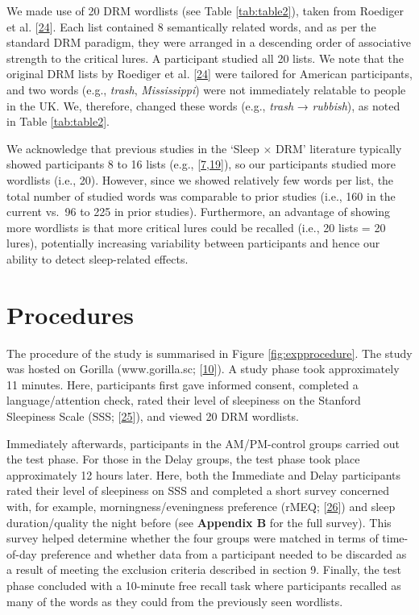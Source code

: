 \documentclass[
]{article}
\begin{document}
We made use of 20 DRM wordlists (see Table \ref{tab:table2}), taken from Roediger et al. {[}\protect\hyperlink{ref-roediger2001a}{24}{]}. Each list contained 8 semantically related words, and as per the standard DRM paradigm, they were arranged in a descending order of associative strength to the critical lures. A participant studied all 20 lists. We note that the original DRM lists by Roediger et al. {[}\protect\hyperlink{ref-roediger2001a}{24}{]} were tailored for American participants, and two words (e.g., \emph{trash}, \emph{Mississippi}) were not immediately relatable to people in the UK. We, therefore, changed these words (e.g., \emph{trash} → \emph{rubbish}), as noted in Table \ref{tab:table2}.

We acknowledge that previous studies in the `Sleep \(\times\) DRM' literature typically showed participants 8 to 16 lists (e.g., {[}\protect\hyperlink{ref-payne2009a}{7},\protect\hyperlink{ref-mckeon2012a}{19}{]}), so our participants studied more wordlists (i.e., 20). However, since we showed relatively few words per list, the total number of studied words was comparable to prior studies (i.e., 160 in the current vs.~96 to 225 in prior studies). Furthermore, an advantage of showing more wordlists is that more critical lures could be recalled (i.e., 20 lists = 20 lures), potentially increasing variability between participants and hence our ability to detect sleep-related effects.

\hypertarget{procedures}{%
\section{Procedures}\label{procedures}}

The procedure of the study is summarised in Figure \ref{fig:expprocedure}. The study was hosted on Gorilla (www.gorilla.sc; {[}\protect\hyperlink{ref-anwyl-irvine2020a}{10}{]}). A study phase took approximately 11 minutes. Here, participants first gave informed consent, completed a language/attention check, rated their level of sleepiness on the Stanford Sleepiness Scale (SSS; {[}\protect\hyperlink{ref-hoddes1973a}{25}{]}), and viewed 20 DRM wordlists.

Immediately afterwards, participants in the AM/PM-control groups carried out the test phase. For those in the Delay groups, the test phase took place approximately 12 hours later. Here, both the Immediate and Delay participants rated their level of sleepiness on SSS and completed a short survey concerned with, for example, morningness/eveningness preference (rMEQ; {[}\protect\hyperlink{ref-adan1991a}{26}{]}) and sleep duration/quality the night before (see \textbf{Appendix B} for the full survey). This survey helped determine whether the four groups were matched in terms of time-of-day preference and whether data from a participant needed to be discarded as a result of meeting the exclusion criteria described in section 9. Finally, the test phase concluded with a 10-minute free recall task where participants recalled as many of the words as they could from the previously seen wordlists.
\end{document}
